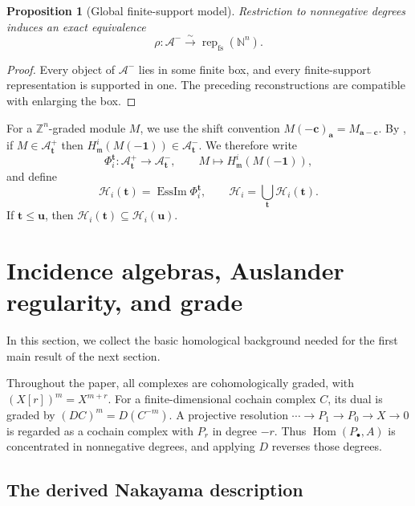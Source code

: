 \documentclass[12pt,reqno]{amsart}
\newtheorem{proposition}[theorem]{Proposition}
\theoremstyle{definition}
\theoremstyle{remark}
\newcommand{\Rep}{\operatorname{rep}}
\newcommand{\Hom}{\operatorname{Hom}}
\newcommand{\EssIm}{\operatorname{EssIm}}
\begin{document}
\begin{proposition}[Global finite-support model]\label{prop:global-fs}
Restriction to nonnegative degrees induces an exact equivalence
\[
\rho:\mathcal A^-\xrightarrow{\sim}\Rep_{\mathrm{fs}}(\mathbb N^n).
\]
\end{proposition}

\begin{proof}
Every object of $\mathcal A^-$ lies in some finite box, and every finite-support
representation is supported in one.  The preceding reconstructions are
compatible with enlarging the box.
\end{proof}

For a $\mathbb{Z}^n$-graded module $M$, we use the shift convention
$M(-\mathbf c)_{\mathbf a}=M_{\mathbf a-\mathbf c}$. By \cite[Proposition~2.8 and Remark~2.9]{BF}, if
$M\in\mathcal A^+_{\mathbf t}$ then
$H^i_{\mathfrak m}(M(-\mathbf1))\in\mathcal A^-_{\mathbf t}$.  We therefore
write
\[
\Phi_i^{\mathbf t}:\mathcal A^+_{\mathbf t}\longrightarrow
\mathcal A^-_{\mathbf t},\qquad
M\longmapsto H^i_{\mathfrak m}(M(-\mathbf1)),
\]
and define
\[
\mathcal H_i(\mathbf t)=\EssIm\Phi_i^{\mathbf t},
\qquad
\mathcal H_i=\bigcup_{\mathbf t}\mathcal H_i(\mathbf t).
\]
If $\mathbf t\le\mathbf u$, then
$\mathcal H_i(\mathbf t)\subseteq\mathcal H_i(\mathbf u)$.

\section{Incidence algebras, Auslander regularity, and grade}\label{sec:homological}
In this section, we collect the basic homological background needed for the first main result of the next section.

Throughout the paper, all complexes are cohomologically graded, with
$(X[r])^m=X^{m+r}$.  For a finite-dimensional cochain complex $C$, its
dual is graded by $(DC)^m=D(C^{-m})$.  A projective resolution
$\cdots\to P_1\to P_0\to X\to0$ is regarded as a cochain complex with
$P_r$ in degree $-r$.  Thus $\Hom(P_\bullet,A)$ is concentrated in
nonnegative degrees, and applying $D$ reverses those degrees.

\subsection{The derived Nakayama description}
\end{document}

